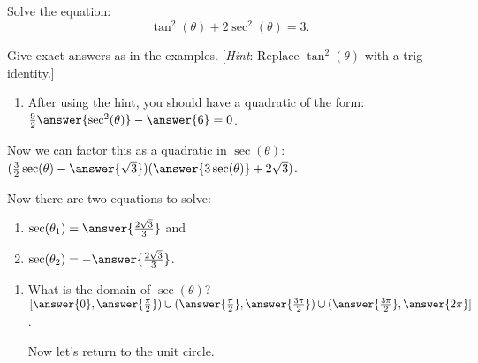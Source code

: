 \documentclass{ximera}
\author{Elizabeth Campolongo}
\begin{document}
\begin{exercise}
Solve the equation:
$$\tan^2(\theta) + 2\sec^2(\theta)=3.$$

Give exact answers as in the examples. [\textit{Hint}: Replace $\tan^2(\theta)$ with a trig identity.]

\begin{enumerate}
\item After using the hint, you should have a quadratic of the form: \smallskip\\

 $\frac{9}{2}\answer{\sec^2(\theta)} -\answer{6} = 0$.
 \end{enumerate}
\begin{exercise}
Now we can factor this as a quadratic in $\sec(\theta)$: \smallskip\\
$(\frac{3}{2}\sec(\theta) - \answer{\sqrt{3}})(\answer{3\sec(\theta)} + 2\sqrt{3})$.

\begin{exercise}
Now there are two equations to solve:
\begin{enumerate}
\item $\sec(\theta_1) = \answer{\frac{2\sqrt{3}}{3}}$ and

\item $\sec(\theta_2) = -\answer{\frac{2\sqrt{3}}{3}}$.
\end{enumerate}

\begin{exercise}
\begin{enumerate}
\item What is the domain of $\sec(\theta)$?\smallskip \\
$[\answer{0},\answer{\frac{\pi}{2}}) \cup (\answer{\frac{\pi}{2}}, \answer{\frac{3\pi}{2}}) \cup (\answer{\frac{3\pi}{2}},\answer{2\pi}]$.


\bigskip
Now let's return to the unit circle. 
\begin{image}
\end{image}
\end{enumerate}
\end{exercise}
\end{exercise}
\end{exercise}
\end{exercise}
\end{document}
